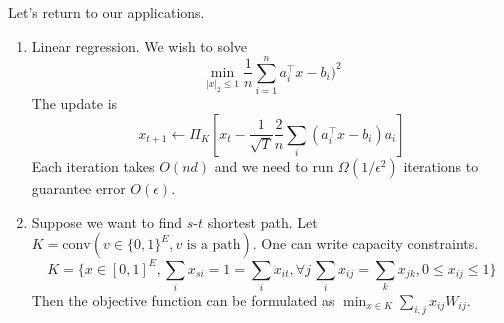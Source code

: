 Let's return to our applications.
\begin{example}
    \begin{enumerate}
        \item Linear regression. We wish to solve
        \[ \min_{|x|_2 \le 1} \frac{1}{n} \sum_{i = 1}^{n} a_i^{\top }x - b_i)^2 \]
        The update is
        \[ x_{t + 1} \gets \Pi_K [x_t - \frac{1}{\sqrt{T}} \frac{2}{n} \sum_i (a_i^{\top} x - b_i) a_i] \]
        Each iteration takes $O(nd)$ and we need to run $\Omega(1/\epsilon^2)$ iterations to guarantee error $O(\epsilon)$.
        \item Suppose we want
        to find $s$-$t$ shortest path.
        Let $K = \mathrm{conv}(v \in \{0, 1\}^{E}, v\text{ is a path})$.
        One can write capacity constraints.
        \[ K = \{x \in [0, 1]^E, \sum_i x_{si} = 1 = \sum_{i} x_{it}, \forall j \, \sum_{i} x_{ij} = \sum_{k} x_{jk}, 0 \le x_{ij} \le 1\} \]
        Then the objective function can be formulated as $\min_{x \in K} \sum_{i,j} x_{ij} W_{ij}$.
    \end{enumerate}
\end{example}